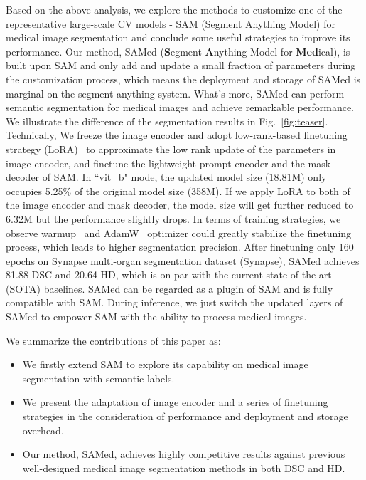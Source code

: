 \documentclass[runningheads]{llncs}
\begin{document}
Based on the above analysis, we explore the methods to customize one of the representative large-scale CV models - SAM (Segment Anything Model) for medical image segmentation and conclude some useful strategies to improve its performance. Our method, SAMed (\textbf{S}egment \textbf{A}nything Model for \textbf{Med}ical), is built upon SAM and only add and update a small fraction of parameters during the customization process, which means the deployment and storage of SAMed is marginal on the segment anything system. What's more, SAMed can perform semantic segmentation for medical images and achieve remarkable performance. We illustrate the difference of the segmentation results in Fig.~\ref{fig:teaser}. Technically, We freeze the image encoder and adopt low-rank-based finetuning strategy (LoRA)~\cite{hulora} to approximate the low rank update of the parameters in image encoder, and finetune the lightweight prompt encoder and the mask decoder of SAM. In ``vit\_b" mode, the updated model size (18.81M) only occupies 5.25\% of the original model size (358M). If we apply LoRA to both of the image encoder and mask decoder, the model size will get further reduced to 6.32M but the performance slightly drops. In terms of training strategies, we observe warmup~\cite{he2016deep,xiong2020layer} and AdamW~\cite{loshchilovdecoupled} optimizer could greatly stabilize the finetuning process, which leads to higher segmentation precision. After finetuning only 160 epochs on Synapse multi-organ segmentation dataset (Synapse), SAMed achieves 81.88 DSC and 20.64 HD, which is on par with the current state-of-the-art (SOTA) baselines. SAMed can be regarded as a plugin of SAM and is fully compatible with SAM. During inference, we just switch the updated layers of SAMed to empower SAM with the ability to process medical images.

We summarize the contributions of this paper as:
\begin{itemize}
    \item We firstly extend SAM to explore its capability on medical image segmentation with semantic labels.
    \item We present the adaptation of image encoder and a series of finetuning strategies in the consideration of performance and deployment and storage overhead.
    \item Our method, SAMed, achieves highly competitive results against previous well-designed medical image segmentation methods in both DSC and HD.
\end{itemize}
\end{document}
